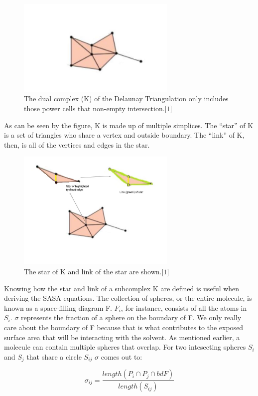 \documentclass{article}
\begin{document}
\begin{figure}[h!]
\caption{The dual complex (K) of the Delaunay Triangulation only includes those power cells that non-empty intersection.$\lbrack1\rbrack$}
\centerline{\includegraphics[width=3in]{Figure9}}
\end{figure}

As can be seen by the figure, K is made up of multiple simplices. The “star” of K is a set of triangles who share a vertex and outside boundary. The “link” of K, then, is all of the vertices and edges in the star.

\begin{figure}[h!]
\caption{The star of K and link of the star are shown.$\lbrack1\rbrack$}
\centerline{\includegraphics[width=3in]{Figure5}}
\end{figure}

Knowing how the star and link of a subcomplex K are defined is useful when deriving the SASA equations.
The collection of spheres, or the entire molecule, is known as a space-filling diagram F. $F_i$, for instance, consists of all the atoms in $S_i$. $\sigma$ represents the fraction of a sphere on the boundary of F. We only really care about the boundary of F because that is what contributes to the exposed surface area that will be interacting with the solvent. As mentioned earlier, a molecule can contain multiple spheres that overlap. For two intesecting spheres $S_i$ and $S_j$ that share a circle $S_{ij}$ $\sigma$ comes out to:

\begin{equation*}
\sigma_{ij} = \frac{length(P_i \cap P_j \cap bd F)}{length(S_{ij})}
\end{equation*}
\end{document}
